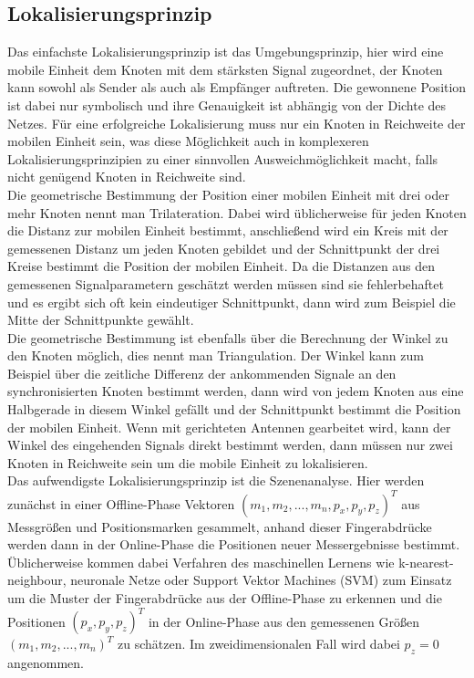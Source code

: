 \subsection{Lokalisierungsprinzip}
Das einfachste Lokalisierungsprinzip ist das Umgebungsprinzip, hier wird eine mobile Einheit dem Knoten mit dem stärksten Signal zugeordnet, der Knoten kann sowohl als Sender als auch als Empfänger auftreten. Die gewonnene Position ist dabei nur symbolisch und ihre Genauigkeit ist abhängig von der Dichte des Netzes. Für eine erfolgreiche Lokalisierung muss nur ein Knoten in Reichweite der mobilen Einheit sein, was diese Möglichkeit auch in komplexeren Lokalisierungsprinzipien zu einer sinnvollen Ausweichmöglichkeit macht, falls nicht genügend Knoten in Reichweite sind. \\
Die geometrische Bestimmung der Position einer mobilen Einheit mit drei oder mehr Knoten nennt man Trilateration. Dabei wird üblicherweise für jeden Knoten die Distanz zur mobilen Einheit bestimmt, anschließend wird ein Kreis mit der gemessenen Distanz um jeden Knoten gebildet und der Schnittpunkt der drei Kreise bestimmt die Position der mobilen Einheit. Da die Distanzen aus den gemessenen Signalparametern geschätzt werden müssen sind sie fehlerbehaftet und es ergibt sich oft kein eindeutiger Schnittpunkt, dann wird zum Beispiel die Mitte der Schnittpunkte gewählt. \\
Die geometrische Bestimmung ist ebenfalls über die Berechnung der Winkel zu den Knoten möglich, dies nennt man Triangulation. Der Winkel kann zum Beispiel über die zeitliche Differenz der ankommenden Signale an den synchronisierten Knoten bestimmt werden, dann wird von jedem Knoten aus eine Halbgerade in diesem Winkel gefällt und der Schnittpunkt bestimmt die Position der mobilen Einheit. %
Wenn mit gerichteten Antennen gearbeitet wird, kann der Winkel des eingehenden Signals direkt bestimmt werden, dann müssen nur zwei Knoten in Reichweite sein um die mobile Einheit zu lokalisieren. \\
Das aufwendigste Lokalisierungsprinzip ist die Szenenanalyse. Hier werden zunächst in einer Offline-Phase Vektoren $(m_1,m_2,...,m_n,p_x,p_y,p_z)^T$ aus Messgrößen und Positionsmarken gesammelt, anhand dieser Fingerabdrücke werden dann in der Online-Phase die Positionen neuer Messergebnisse bestimmt. Üblicherweise kommen dabei Verfahren des maschinellen Lernens wie k-nearest-neighbour, neuronale Netze oder Support Vektor Machines (SVM) zum Einsatz um die Muster der Fingerabdrücke aus der Offline-Phase zu erkennen und die Positionen $(p_x,p_y,p_z)^T$ in der Online-Phase aus den gemessenen Größen $(m_1,m_2,...,m_n)^T$ zu schätzen. Im zweidimensionalen Fall wird dabei $p_z = 0$ angenommen.

